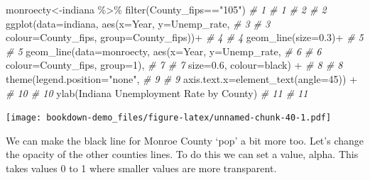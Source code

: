 \documentclass[
]{book}
\newenvironment{Shaded}{\begin{snugshade}}{\end{snugshade}}
\newcommand{\AttributeTok}[1]{\textcolor[rgb]{0.77,0.63,0.00}{#1}}
\newcommand{\CommentTok}[1]{\textcolor[rgb]{0.56,0.35,0.01}{\textit{#1}}}
\newcommand{\DecValTok}[1]{\textcolor[rgb]{0.00,0.00,0.81}{#1}}
\newcommand{\FloatTok}[1]{\textcolor[rgb]{0.00,0.00,0.81}{#1}}
\newcommand{\FunctionTok}[1]{\textcolor[rgb]{0.00,0.00,0.00}{#1}}
\newcommand{\NormalTok}[1]{#1}
\newcommand{\OtherTok}[1]{\textcolor[rgb]{0.56,0.35,0.01}{#1}}
\newcommand{\SpecialCharTok}[1]{\textcolor[rgb]{0.00,0.00,0.00}{#1}}
\newcommand{\StringTok}[1]{\textcolor[rgb]{0.31,0.60,0.02}{#1}}
\begin{document}
\begin{Shaded}
\begin{Highlighting}[]
\NormalTok{monroecty}\OtherTok{\textless{}{-}}\NormalTok{indiana }\SpecialCharTok{\%\textgreater{}\%} \FunctionTok{filter}\NormalTok{(County\_fips}\SpecialCharTok{==}\StringTok{"105"}\NormalTok{)       }\CommentTok{\# 1   \# 1}
                                                        \CommentTok{\# 2   \# 2}
\FunctionTok{ggplot}\NormalTok{(}\AttributeTok{data=}\NormalTok{indiana, }\FunctionTok{aes}\NormalTok{(}\AttributeTok{x=}\NormalTok{Year, }\AttributeTok{y=}\NormalTok{Unemp\_rate,          }\CommentTok{\# 3   \# 3}
    \AttributeTok{colour=}\NormalTok{County\_fips, }\AttributeTok{group=}\NormalTok{County\_fips))}\SpecialCharTok{+}            \CommentTok{\# 4   \# 4}
  \FunctionTok{geom\_line}\NormalTok{(}\AttributeTok{size=}\FloatTok{0.3}\NormalTok{)}\SpecialCharTok{+}                                  \CommentTok{\# 5   \# 5}
  \FunctionTok{geom\_line}\NormalTok{(}\AttributeTok{data=}\NormalTok{monroecty, }\FunctionTok{aes}\NormalTok{(}\AttributeTok{x=}\NormalTok{Year, }\AttributeTok{y=}\NormalTok{Unemp\_rate,   }\CommentTok{\# 6   \# 6}
    \AttributeTok{colour=}\NormalTok{County\_fips, }\AttributeTok{group=}\DecValTok{1}\NormalTok{),                       }\CommentTok{\# 7   \# 7}
    \AttributeTok{size=}\FloatTok{0.6}\NormalTok{, }\AttributeTok{colour=}\StringTok{\textquotesingle{}black\textquotesingle{}}\NormalTok{) }\SpecialCharTok{+}                         \CommentTok{\# 8   \# 8}
  \FunctionTok{theme}\NormalTok{(}\AttributeTok{legend.position=}\StringTok{"none"}\NormalTok{,                         }\CommentTok{\# 9   \# 9}
    \AttributeTok{axis.text.x=}\FunctionTok{element\_text}\NormalTok{(}\AttributeTok{angle=}\DecValTok{45}\NormalTok{)) }\SpecialCharTok{+}              \CommentTok{\# 10  \# 10}
  \FunctionTok{ylab}\NormalTok{(}\StringTok{\textquotesingle{}Indiana Unemployment Rate by County\textquotesingle{}}\NormalTok{)          }\CommentTok{\# 11  \# 11}
\end{Highlighting}
\end{Shaded}

\texttt{[image: bookdown-demo\_files/figure-latex/unnamed-chunk-40-1.pdf]}

We can make the black line for Monroe County `pop' a bit more too. Let's change the opacity of the other counties lines. To do this we can set a value, alpha. This takes values 0 to 1 where smaller values are more transparent.
\end{document}
